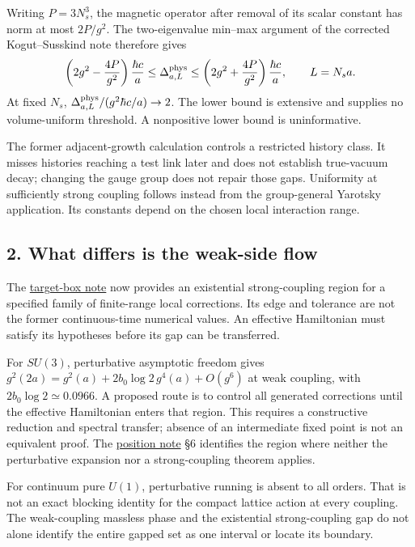 \documentclass[11pt,a4paper]{article}
\begin{document}
Writing \(P=3N_s^3\), the magnetic operator after removal of its scalar
constant has norm at most \(2P/g^2\). The two-eigenvalue min--max
argument of the corrected Kogut--Susskind note therefore gives
\[\left(2g^2-\frac{4P}{g^2}\right)\frac{\hbar c}{a}
\le\Delta^{\rm phys}_{a,L}\le
\left(2g^2+\frac{4P}{g^2}\right)\frac{\hbar c}{a},\qquad L=N_sa.\] At
fixed \(N_s\), \(\Delta^{\rm phys}_{a,L}/(g^2\hbar c/a)\to2\). The lower
bound is extensive and supplies no volume-uniform threshold. A
nonpositive lower bound is uninformative.

The former adjacent-growth calculation controls a restricted history
class. It misses histories reaching a test link later and does not
establish true-vacuum decay; changing the gauge group does not repair
those gaps. Uniformity at sufficiently strong coupling follows instead
from the group-general Yarotsky application. Its constants depend on the
chosen local interaction range.

\subsection{2. What differs is the weak-side
flow}\label{what-differs-is-the-weak-side-flow}

The \href{strong-coupling-target-box.md}{target-box note} now provides
an existential strong-coupling region for a specified family of
finite-range local corrections. Its edge and tolerance are not the
former continuous-time numerical values. An effective Hamiltonian must
satisfy its hypotheses before its gap can be transferred.

For \(SU(3)\), perturbative asymptotic freedom gives
\(g^2(2a)=g^2(a)+2b_0\log2\,g^4(a)+O(g^6)\) at weak coupling, with
\(2b_0\log2\simeq0.0966\). A proposed route is to control all generated
corrections until the effective Hamiltonian enters that region. This
requires a constructive reduction and spectral transfer; absence of an
intermediate fixed point is not an equivalent proof. The
\href{mass-gap-position.md}{position note} §6 identifies the region
where neither the perturbative expansion nor a strong-coupling theorem
applies.

For continuum pure \(U(1)\), perturbative running is absent to all
orders. That is not an exact blocking identity for the compact lattice
action at every coupling. The weak-coupling massless phase and the
existential strong-coupling gap do not alone identify the entire gapped
set as one interval or locate its boundary.
\end{document}
